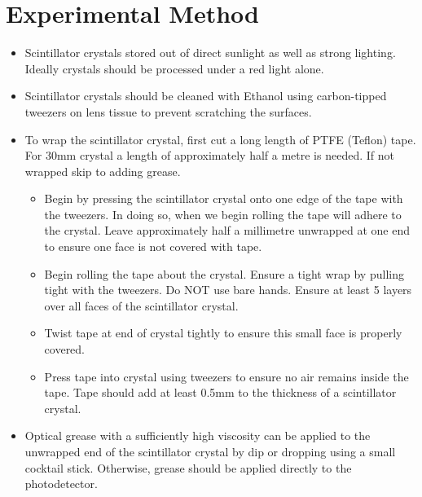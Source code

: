 \section{Experimental Method}
\begin{itemize}
 \item Scintillator crystals stored out of direct sunlight as well as strong 
lighting. Ideally crystals should be processed under a red light alone.
 \item Scintillator crystals should be cleaned with Ethanol using carbon-tipped 
tweezers on lens tissue to prevent scratching the surfaces.
 \item To wrap the scintillator crystal, first cut a long length of PTFE 
(Teflon) tape. For 30mm crystal a length of approximately half a metre is 
needed. If not wrapped skip to adding grease.
\begin{itemize}
 \item Begin by pressing the scintillator crystal onto one edge of the tape 
with the tweezers. In doing so, when we begin rolling the tape will adhere to 
the crystal. Leave approximately half a millimetre unwrapped at one end to 
ensure one face is not covered with tape. 
 \item Begin rolling the tape about the crystal. Ensure a tight wrap by pulling 
tight with the tweezers. Do NOT use bare hands. Ensure at least 5 layers over 
all faces of the scintillator crystal.
 \item Twist tape at end of crystal tightly to ensure this small face is 
properly covered.
 \item Press tape into crystal using tweezers to ensure no air remains inside 
the tape. Tape should add at least 0.5mm to the thickness of a scintillator 
crystal.
\end{itemize}
\item Optical grease with a sufficiently high viscosity can be applied to 
the unwrapped end of the scintillator crystal by dip or dropping using a small 
cocktail stick. Otherwise, grease should be applied directly to the 
photodetector.
\end{itemize}